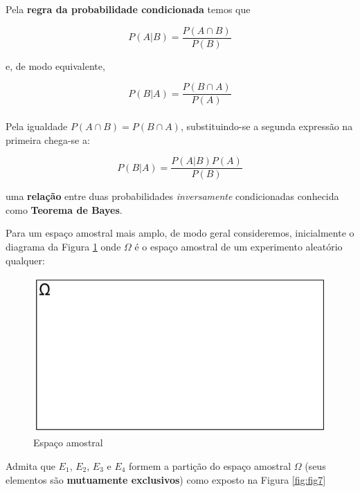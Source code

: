 \documentclass[
]{book}
\begin{document}
\hfill\break

Pela \textbf{regra da probabilidade condicionada} temos que

\hfill\break

\[
P(A|B) = \frac{P(A \cap B)}{ P(B)}
\]

\hfill\break

e, de modo equivalente,

\hfill\break

\[
P(B|A) = \frac{P(B \cap A)}{ P(A)}
\]\\

Pela igualdade \(P(A \cap B)=P(B \cap A)\), substituindo-se a segunda expressão na primeira chega-se a:

\hfill\break

\[
P(B|A) = \frac{P(A|B) P(A)}{P(B)}
\]

\hfill\break

uma \textbf{relação} entre duas probabilidades \emph{inversamente} condicionadas conhecida como \textbf{Teorema de Bayes}.

\hfill\break

Para um espaço amostral mais amplo, de modo geral consideremos, inicialmente o diagrama da Figura \ref{fig:fig6} onde \(\Omega\) é o espaço amostral de um experimento aleatório qualquer:

\hfill\break

\begin{figure}

{\centering \includegraphics[width=0.8\linewidth]{images4/bayes_1} 

}

\caption{Espaço amostral}\label{fig:fig6}
\end{figure}

\hfill\break

Admita que \(E_{1}\), \(E_{2}\), \(E_{3}\) e \(E_{4}\) formem a partição do espaço amostral \(\Omega\) (seus elementos são \textbf{mutuamente exclusivos}) como exposto na Figura \ref{fig:fig7}
\end{document}
